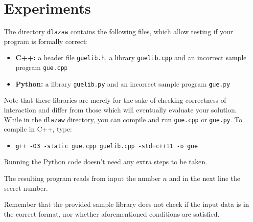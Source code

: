 \documentclass{spiral}
\begin{document}
\section{Experiments}
    The directory \texttt{dlazaw} contains the following files,
    which allow testing if your program is formally correct:
    \begin{itemize}
        \item \textbf{C++:} a header file \texttt{guelib.h},
            a library \texttt{guelib.cpp} and an incorrect sample program
            \texttt{gue.cpp}
        \item \textbf{Python:} a library \texttt{guelib.py} and
            an incorrect sample program \texttt{gue.py}
    \end{itemize}

    Note that these libraries are merely for the sake of checking
    correctness of interaction and differ from those which will eventually
    evaluate your solution.
    While in the \texttt{dlazaw} directory,
    you can compile and run \texttt{gue.cpp} or \texttt{gue.py}.
    To compile in C++, type:

    \begin{itemize}
        \item \texttt{g++ -O3 -static gue.cpp guelib.cpp -std=c++11 -o gue}
    \end{itemize}

    Running the Python code doesn't need any extra steps to be taken.

    The resulting program reads from input the number $n$
    and in the next line the secret number.

    Remember that the provided sample library does not check
    if the input data is in the correct format,
    nor whether aforementioned conditions are satisfied.
\end{document}
